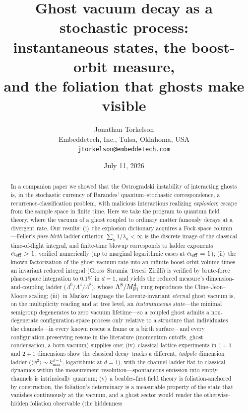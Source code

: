 \documentclass[11pt]{article}
\title{Ghost vacuum decay as a stochastic process:\\
instantaneous states, the boost-orbit measure,\\
and the foliation that ghosts make visible}
\author{Jonathan Torkelson\\[2pt]
\small Embeddetech, Inc., Tulsa, Oklahoma, USA\\
\small\texttt{jtorkelson@embeddetech.com}}
\date{July 11, 2026}
\theoremstyle{definition}
\theoremstyle{remark}
\newcommand{\avg}[1]{\langle #1 \rangle}
\begin{document}
\maketitle

\begin{abstract}
In a companion paper we showed that the Ostrogradski instability of
interacting ghosts is, in the stochastic currency of Barandes'
quantum--stochastic correspondence, a recurrence-classification
problem, with malicious interactions realizing \emph{explosion}:
escape from the sample space in finite time. Here we take the program
to quantum field theory, where the vacuum of a ghost coupled to
ordinary matter famously decays at a divergent rate. Our results:
(i)~the explosion dictionary acquires a Fock-space column---Feller's
\emph{pure-birth} ladder criterion $\sum_n 1/\lambda_n<\infty$ is the discrete image of
the classical time-of-flight integral, and finite-time blowup
corresponds to ladder exponents $\alpha_{\rm eff}>1$, verified numerically (up to
marginal logarithmic cases at $\alpha_{\rm eff}=1$); (ii)~the known factorization of the ghost
vacuum rate into an infinite boost-orbit volume times an invariant
reduced integral (Gross--Strumia--Teresi--Zirilli) is verified by
brute-force phase-space integration to $0.1\%$ in $d{=}1$, and yields
the reduced measure's dimension-and-coupling ladder
($\Lambda^{0}/\Lambda^{4}/\Lambda^{8}$),
whose $\Lambda^{8}/M_{\rm Pl}^{4}$ rung reproduces the
Cline--Jeon--Moore scaling; (iii)~in Markov language
the Lorentz-invariant \emph{eternal} ghost vacuum is, on the
multiplicity reading and at tree level, an
\emph{instantaneous state}---the minimal semigroup degenerates to
zero vacuum lifetime---so a coupled ghost admits a non-degenerate
configuration-space process only relative to a structure that individuates the channels---in every known rescue a frame or a birth surface---and every
configuration-preserving rescue in the literature (momentum cutoffs, ghost condensation, a
born vacuum) supplies one; (iv)~classical lattice experiments in
$1{+}1$ and $2{+}1$ dimensions show the classical decay tracks a
different, \emph{tadpole} dimension ladder ($\avg{\phi^2}\sim
k_{\max}^{d-1}$, logarithmic at $d{=}1$), with the channel ladder flat to classical dynamics within the
measurement resolution---spontaneous emission into empty channels is intrinsically
quantum; (v)~a beables-first field theory is foliation-anchored by
construction, the foliation's determinacy is a measurable property of
the state that vanishes continuously at the vacuum, and a ghost
sector would render the otherwise-hidden foliation observable (the hiddenness

\end{abstract}
\end{document}
